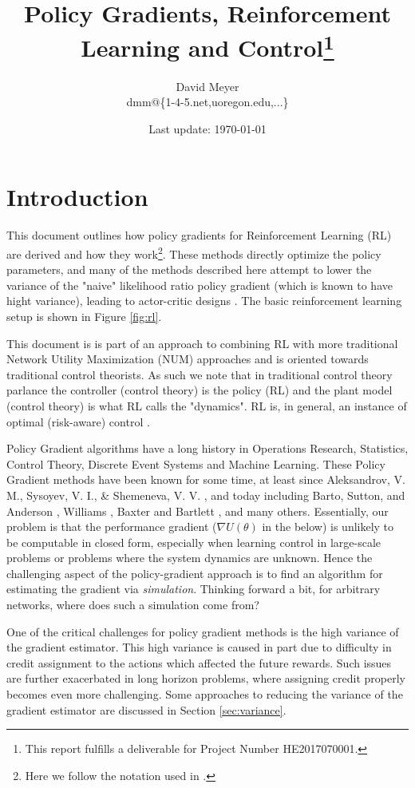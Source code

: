 \documentclass[11pt, oneside]{article}   	%
\title{Policy Gradients, Reinforcement Learning and Control\footnote{This report fulfills a deliverable for Project Number HE2017070001.}}
\author{David Meyer \\ dmm@\{1-4-5.net,uoregon.edu,...\}}
\date{Last update: \today}							%
\begin{document}
\maketitle

\section{Introduction} 
\label{sec:intro}
This document outlines how policy gradients for Reinforcement Learning (RL) are derived and how they work\footnote{Here we follow the notation used in \cite{SuttonBook}.}.  
These methods directly optimize the policy parameters, and many of the methods described here 
attempt to lower the variance of the "naive" likelihood ratio policy gradient (which is known to have hight variance),
leading to actor-critic designs \cite{NIPS1999_1786}. The basic reinforcement learning setup is shown in Figure \ref{fig:rl}. 

\bigskip
\noindent
This document is is part of an approach to combining RL with more traditional Network Utility Maximization (NUM) approaches and is
oriented towards traditional control theorists.  As such we note that in traditional control theory parlance the controller (control theory) is the policy (RL) and the plant model
(control theory) is what RL calls the "dynamics".  RL is, in general, an instance of optimal (risk-aware) control \cite{Todorov06optimalcontrol}.


\bigskip
\noindent
Policy Gradient algorithms have a long history in Operations Research, Statistics, Control Theory, Discrete Event Systems and Machine Learning. These
Policy Gradient methods have been known for some time, at least since Aleksandrov, V. M., Sysoyev, V. I., \& Shemeneva, V. V. \cite{oALE68a}, and today including
Barto, Sutton, and Anderson \cite{Barto:1990:NAE:104134.104143}, Williams \cite{Williams1992},  Baxter and Bartlett \cite{Baxter:2001:IPE:1622845.1622855}, 
and many others. Essentially, our problem is that the performance gradient ($\nabla U(\theta)$ in the below) is unlikely to be computable in closed form, especially 
when learning control in large-scale problems or problems where the system dynamics are unknown. Hence the challenging aspect of the policy-gradient approach 
is to find an algorithm for estimating  the gradient via \emph{simulation}. Thinking forward a bit, for arbitrary networks, where does such a simulation come from?

\bigskip
\noindent
One of the critical challenges for policy gradient methods is the high variance of the gradient estimator. This high variance is caused in part due to difficulty in 
credit assignment to the actions which affected the future rewards. Such issues are further exacerbated in long horizon problems, where assigning credit 
properly becomes even more challenging. Some approaches to reducing the variance of the gradient estimator are discussed in Section \ref{sec:variance}.
\end{document}
